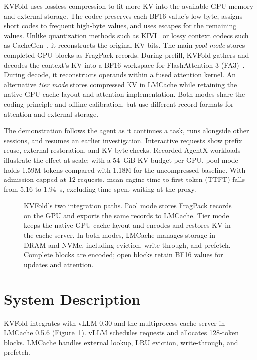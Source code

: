 \documentclass[conference]{IEEEtran}
\begin{document}
KVFold uses lossless compression to fit more KV into the available GPU
memory and external storage. The codec preserves each BF16 value's low
byte, assigns short codes to frequent high-byte values, and uses escapes
for the remaining values. Unlike quantization methods such as
KIVI~\cite{kivi} or lossy context codecs such as CacheGen~\cite{cachegen},
it reconstructs the original KV bits. The main \emph{pool mode} stores
completed GPU blocks as FragPack records. During prefill, KVFold gathers
and decodes the context's KV into a BF16 workspace for FlashAttention-3
(FA3)~\cite{fa3}. During decode, it reconstructs operands within a fused
attention kernel. An alternative \emph{tier mode} stores compressed KV in
LMCache while retaining the native GPU cache layout and attention
implementation. Both modes share the coding principle and offline
calibration, but use different record formats for attention and external
storage.

The demonstration follows the agent as it continues a task, runs alongside
other sessions, and resumes an earlier investigation. Interactive requests
show prefix reuse, external restoration, and KV byte checks.
Recorded AgentX workloads~\cite{agentx} illustrate the effect at scale:
with a 54~GiB KV budget per GPU, pool mode holds 1.59M tokens compared
with 1.18M for the uncompressed baseline. With admission capped at
12 requests, mean engine time to first token (TTFT) falls from 5.16 to
1.94~s, excluding time spent waiting at the proxy.

\begin{figure}[t]
\centering

\caption{KVFold's two integration paths. Pool mode stores FragPack records
on the GPU and exports the same records to LMCache. Tier mode keeps the
native GPU cache layout and encodes and restores KV in the cache server.
In both modes, LMCache manages storage in DRAM and NVMe, including eviction,
write-through, and prefetch. Complete blocks are encoded; open blocks retain
BF16 values for updates and attention.}
\label{fig:architecture}
\end{figure}

\section{System Description}
\label{sec:design}
KVFold integrates with vLLM 0.30 and the multiprocess cache server in
LMCache 0.5.6 (Figure~\ref{fig:architecture}). vLLM schedules requests and
allocates 128-token blocks. LMCache handles external lookup, LRU eviction,
write-through, and prefetch.
\end{document}
